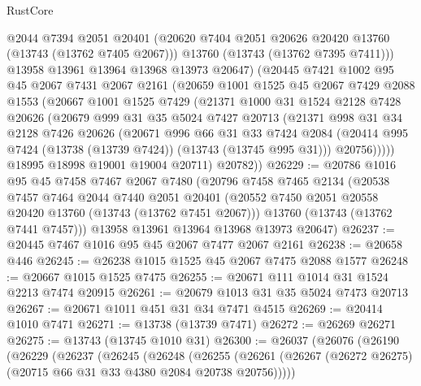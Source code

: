 \begin{lexlean}{RustCore}
\begin{coremodule}
          @2044
          @7394
          @2051
          @20401
          (@20620 @7404 @2051 @20626 @20420 @13760 (@13743 (@13762 @7405 @2067)))
          @13760
          (@13743 (@13762 @7395 @7411)))
        @13958
        @13961
        @13964
        @13968
        @13973
        @20647)
      (@20445
        @7421
        @1002
        @95
        @45
        @2067
        @7431
        @2067
        @2161
        (@20659
          @1001
          @1525
          @45
          @2067
          @7429
          @2088
          @1553
          (@20667
            @1001
            @1525
            @7429
            (@21371
              @1000
              @31
              @1524
              @2128
              @7428
              @20626
              (@20679
                @999
                @31
                @35
                @5024
                @7427
                @20713
                (@21371
                  @998
                  @31
                  @34
                  @2128
                  @7426
                  @20626
                  (@20671
                    @996
                    @66
                    @31
                    @33
                    @7424
                    @2084
                    (@20414 @995 @7424 (@13738 (@13739 @7424)) (@13743 (@13745 @995 @31)))
                    @20756)))))
          @18995
          @18998
          @19001
          @19004
          @20711)
        @20782))
@26229 := @20786
    @1016
    @95
    @45
    @7458
    @7467
    @2067
    @7480
    (@20796
      @7458
      @7465
      @2134
      (@20538
        @7457
        @7464
        @2044
        @7440
        @2051
        @20401
        (@20552 @7450 @2051 @20558 @20420 @13760 (@13743 (@13762 @7451 @2067)))
        @13760
        (@13743 (@13762 @7441 @7457)))
      @13958
      @13961
      @13964
      @13968
      @13973
      @20647)
@26237 := @20445 @7467 @1016 @95 @45 @2067 @7477 @2067 @2161
@26238 := @20658 @446
@26245 := @26238 @1015 @1525 @45 @2067 @7475 @2088 @1577
@26248 := @20667 @1015 @1525 @7475
@26255 := @20671 @111 @1014 @31 @1524 @2213 @7474 @20915
@26261 := @20679 @1013 @31 @35 @5024 @7473 @20713
@26267 := @20671 @1011 @451 @31 @34 @7471 @4515
@26269 := @20414 @1010 @7471
@26271 := @13738 (@13739 @7471)
@26272 := @26269 @26271
@26275 := @13743 (@13745 @1010 @31)
@26300 := @26037
    (@26076
      (@26190
        (@26229
          (@26237
            (@26245
              (@26248
                (@26255
                  (@26261 (@26267 (@26272 @26275) (@20715 @66 @31 @33 @4380 @2084 @20738 @20756)))))

\end{coremodule}
\end{lexlean}

